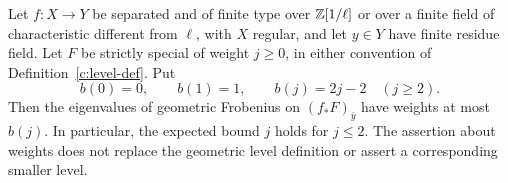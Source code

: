 \begin{proposition}
\label{c:improved-zero-weight}
Let $f:X\to Y$ be separated and of finite type over $\mathbb Z[1/\ell]$
or over a finite field of characteristic different from $\ell$, with
$X$ regular, and let $y\in Y$ have finite residue field.  Let $F$ be
strictly special of weight $j\geq0$, in either convention of
Definition~\ref{c:level-def}.  Put
\[
 b(0)=0,\qquad b(1)=1,\qquad b(j)=2j-2\quad(j\geq2).
\]
Then the eigenvalues of geometric Frobenius on
$(f_*F)_{\bar y}$ have weights at most $b(j)$.
In particular, the expected bound $j$ holds for $j\leq2$.
The assertion about weights does not replace the geometric level
definition or assert a corresponding smaller level.
\end{proposition}

